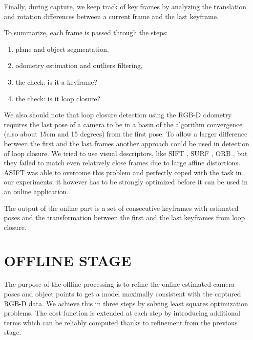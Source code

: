 \documentclass[letterpaper, 10 pt, conference]{ieeeconf}  %
\begin{document}
Finally, during capture, we keep track of key frames by analyzing the translation and rotation differences between a 
current frame and the last keyframe.

To summarize, each frame is passed through the steps:

\begin{enumerate}
 \item plane and object segmentation,
 \item odometry estimation and outliers filtering,
 \item the check: is it a keyframe?
 \item the check: is it loop closure?
\end{enumerate}

We also should note that loop closure detection using the RGB-D odometry requires
the last pose of a camera to be in a basin of
the algorithm convergence (also about 15cm and 15 degrees) from the first pose. 
To allow a larger difference between the first and the last frames
another approach could be used in detection of loop closure. We tried to use visual descriptors, like
SIFT \cite{lowe2004distinctive}, SURF \cite{bay2006surf}, ORB \cite{rublee2011orb}, but they failed to match even
relatively close frames due to large affine distortions.
ASIFT \cite{morel2009asift} was able to overcome this problem
and perfectly coped with the task in our experiments;
it however has to be strongly optimized before it can be used in an online application.

The output of the online part is a set of consecutive keyframes with 
estimated poses and the transformation between the first and the last 
keyframes from loop closure.


\section{OFFLINE STAGE}

\label{sec:offline}

The purpose of the offline processing is to refine the online-estimated 
camera poses and object points to get a model maximally 
consistent with the captured RGB-D data. We achieve this in three steps by 
solving least squares optimization problems. The cost function is extended at each step 
by introducing additional terms which can be reliably computed
thanks to refinement from the previous stage.

\end{document}
